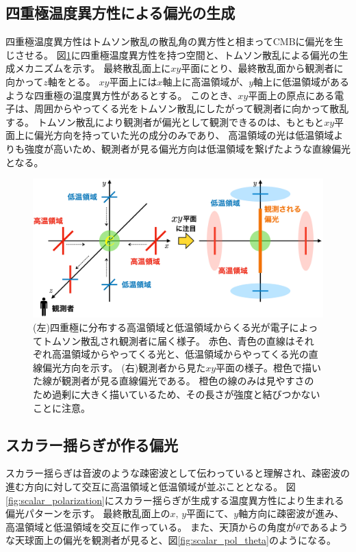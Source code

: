 \documentclass[../../main.tex]{subfiles}
\begin{document}
\subsection{四重極温度異方性による偏光の生成}
四重極温度異方性はトムソン散乱の散乱角の異方性と相まってCMBに偏光を生じさせる。
図\ref{fig:thomson_polarization}に四重極温度異方性を持つ空間と、トムソン散乱による偏光の生成メカニズムを示す。
最終散乱面上に$xy$平面にとり、最終散乱面から観測者に向かって$z$軸をとる。
$xy$平面上には$x$軸上に高温領域が、$y$軸上に低温領域があるような四重極の温度異方性があるとする。
このとき、$xy$平面上の原点にある電子は、周囲からやってくる光をトムソン散乱にしたがって観測者に向かって散乱する。
トムソン散乱により観測者が偏光として観測できるのは、もともと$xy$平面上に偏光方向を持っていた光の成分のみであり、
高温領域の光は低温領域よりも強度が高いため、観測者が見る偏光方向は低温領域を繋げたような直線偏光となる。
\begin{figure}[H]
    \centering
    \includegraphics[width=1.0\textwidth]{intro/thomson_polarization.pdf}
    \caption{(左)四重極に分布する高温領域と低温領域からくる光が電子によってトムソン散乱され観測者に届く様子。
    赤色、青色の直線はそれぞれ高温領域からやってくる光と、低温領域からやってくる光の直線偏光方向を示す。
    (右)観測者から見た$xy$平面の様子。橙色で描いた線が観測者が見る直線偏光である。
    橙色の線のみは見やすさのため過剰に大きく描いているため、その長さが強度と結びつかないことに注意。}
    \label{fig:thomson_polarization}
\end{figure}

\subsection{スカラー揺らぎが作る偏光}
スカラー揺らぎは音波のような疎密波として伝わっていると理解され、疎密波の進む方向に対して交互に高温領域と低温領域が並ぶこととなる。
図\ref{fig:scalar_polarization}にスカラー揺らぎが生成する温度異方性により生まれる偏光パターンを示す。
最終散乱面上の$x,\,y$平面にて、$y$軸方向に疎密波が進み、高温領域と低温領域を交互に作っている。
また、天頂からの角度が$\theta$であるような天球面上の偏光を観測者が見ると、図\ref{fig:scalar_pol_theta}のようになる。
\end{document}
